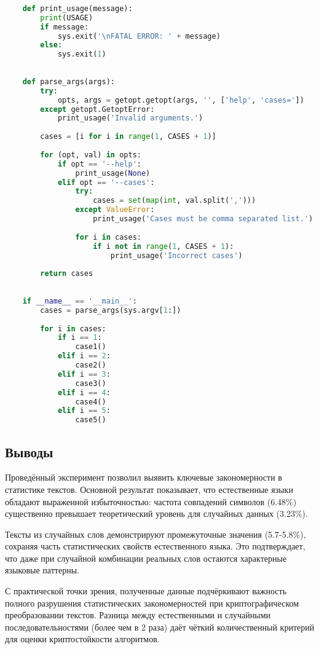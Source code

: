 \documentclass[12pt]{article}
\begin{document}
\begin{lstlisting}[language=Python]
    
    def print_usage(message):
        print(USAGE)
        if message:
            sys.exit('\nFATAL ERROR: ' + message)
        else:
            sys.exit(1)
    
    
    def parse_args(args):
        try:
            opts, args = getopt.getopt(args, '', ['help', 'cases='])
        except getopt.GetoptError:
            print_usage('Invalid arguments.')
    
        cases = [i for i in range(1, CASES + 1)]
    
        for (opt, val) in opts:
            if opt == '--help':
                print_usage(None)
            elif opt == '--cases':
                try:
                    cases = set(map(int, val.split(',')))
                except ValueError:
                    print_usage('Cases must be comma separated list.')
    
                for i in cases:
                    if i not in range(1, CASES + 1):
                        print_usage('Incorrect cases')
    
        return cases
    
    
    if __name__ == '__main__':
        cases = parse_args(sys.argv[1:])
    
        for i in cases:
            if i == 1:
                case1()
            elif i == 2:
                case2()
            elif i == 3:
                case3()
            elif i == 4:
                case4()
            elif i == 5:
                case5()


\end{lstlisting}

\subsection*{Выводы}
Проведённый эксперимент позволил выявить ключевые закономерности в статистике текстов. Основной результат показывает, что естественные языки обладают выраженной избыточностью: частота совпадений символов (6.48\%) существенно превышает теоретический уровень для случайных данных (3.23\%). 

Тексты из случайных слов демонстрируют промежуточные значения (5.7-5.8\%), сохраняя часть статистических свойств естественного языка. Это подтверждает, что даже при случайной комбинации реальных слов остаются характерные языковые паттерны.

С практической точки зрения, полученные данные подчёркивают важность полного разрушения статистических закономерностей при криптографическом преобразовании текстов. Разница между естественными и случайными последовательностями (более чем в 2 раза) даёт чёткий количественный критерий для оценки криптостойкости алгоритмов.
\end{document}
